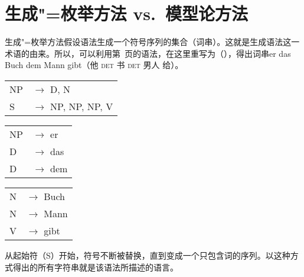 
\chapter{生成"=枚举方法 vs.\ 模型论方法}
\label{Abschnitt-Generativ-Modelltheoretisch}

生成"=枚举方法假设语法生成一个符号序列的集合（词串）。这就是生成语法这一术语的由来。所以，可以利用第~\pageref{bsp-grammatik-psg}页的语法，在这里重写为（），得出词串er das Buch dem Mann gibt（他 \textsc{det} 书 \textsc{det} 男人 给）。
\ea
\label{bsp-grammatik-psg-zwei}
\begin{tabular}[t]{@{}l@{ }l}
{NP} & {$\to$ D, N}\\          
{S}  & {$\to$ NP, NP, NP, V}
\end{tabular}\hspace{2cm}%
\begin{tabular}[t]{@{}l@{ }l}
{NP} & {$\to$ er}\\
{D}  & {$\to$ das}\\
{D}  & {$\to$ dem}\\
\end{tabular}\hspace{8mm}
\begin{tabular}[t]{@{}l@{ }l}
{N} & {$\to$ Buch}\\
{N} & {$\to$ Mann}\\
{V} & {$\to$ gibt}\\
\end{tabular}
\z
从起始符（S）开始，符号不断被替换，直到变成一个只包含词的序列。以这种方式得出的所有字符串就是该语法所描述的语言。

